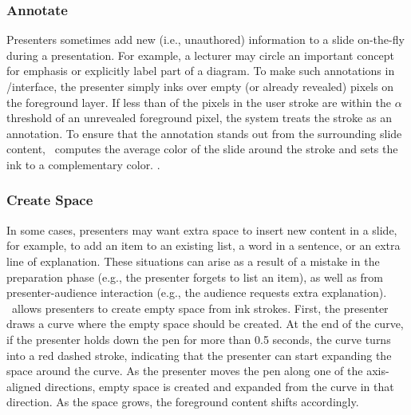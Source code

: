 \subsubsection{Annotate}
Presenters sometimes add new (i.e., unauthored) information to a slide on-the-fly during a presentation.
%
For example, a lecturer may circle an important concept for emphasis or explicitly label part of a diagram. 
%
To make such annotations in /interface, the presenter simply inks over empty (or already revealed) pixels on the foreground layer. If less than  of the pixels in the user stroke are within the $\alpha$ threshold of an unrevealed foreground pixel, the system treats the stroke as an annotation. To ensure that the annotation stands out from the surrounding slide content, \interface\ computes the average color of the slide around the stroke and sets the ink to a complementary color. . 

\subsubsection{Create Space}
In some cases, presenters may want extra space to insert new content in a slide, for example, to add an item to an existing list, a word in a sentence, or an extra line of explanation. These situations can arise as a result of a mistake in the preparation phase (e.g., the presenter forgets to list an item), as well as from presenter-audience interaction (e.g., the audience requests extra explanation). \interface\ allows presenters to create empty space from ink strokes. First, the presenter draws a curve where the empty space should be created. At the end of the curve, if the presenter holds down the pen for more than 0.5 seconds, the curve turns into a red dashed stroke, indicating that the presenter can start expanding the space around the curve. As the presenter moves the pen along one of the axis-aligned directions, empty space is created and expanded from the curve in that direction.  As the space grows, the foreground content shifts accordingly. 
